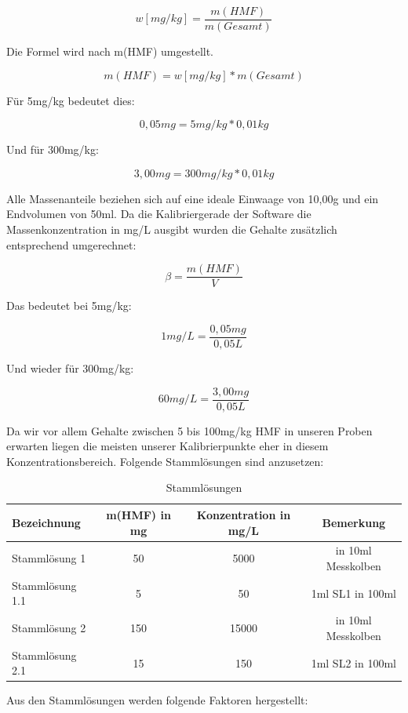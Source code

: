 	\[w[mg/kg]=\frac{ m(HMF) }{ m(Gesamt) }\]
	
Die Formel wird nach m(HMF) umgestellt.

	\[m(HMF)=w[mg/kg]*m(Gesamt)\]
	
Für 5mg/kg bedeutet dies:
	
	\[0,05mg=5mg/kg*0,01kg\]
	
Und für 300mg/kg:

	\[3,00mg=300mg/kg*0,01kg\]
	
Alle Massenanteile beziehen sich auf eine ideale Einwaage von 10,00g und ein Endvolumen von 50ml.
Da die Kalibriergerade der Software die Massenkonzentration in mg/L ausgibt wurden die Gehalte zusätzlich entsprechend umgerechnet:

\[\beta=\frac{ m(HMF) }{ V }\]

Das bedeutet bei 5mg/kg:

\[1mg/L=\frac{ 0,05mg }{ 0,05L }\]

Und wieder für 300mg/kg:

\[60mg/L=\frac{ 3,00mg }{ 0,05L }\]

Da wir vor allem Gehalte zwischen 5 bis 100mg/kg HMF in unseren Proben erwarten liegen die meisten unserer Kalibrierpunkte eher in diesem Konzentrationsbereich.
Folgende Stammlösungen sind anzusetzen:

\begin{table}[htbp]
	\centering
		\begin{tabular}{l|c|c|c}
			Bezeichnung & m(HMF) in mg & Konzentration in mg/L & Bemerkung\\
			\hline
			Stammlösung 1 & 50 & 5000  & in 10ml Messkolben\\
			\hline
			Stammlösung 1.1 & 5 & 50 & 1ml SL1 in 100ml\\
			\hline
			Stammlösung 2 & 150 & 15000 & in 10ml Messkolben\\
			\hline
			Stammlösung 2.1 & 15 & 150 & 1ml SL2 in 100ml\\
		\end{tabular}
	\caption{Stammlösungen}
	\label{tab:Stammlösungen}
\end{table}

Aus den Stammlösungen werden folgende Faktoren hergestellt:

